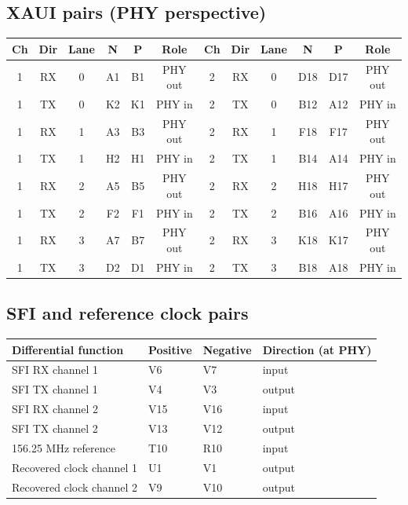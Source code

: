 \documentclass[10pt,a4paper]{article}
\begin{document}
\subsection{XAUI pairs (PHY perspective)}
\small
\begin{tabular}{@{}cccccc|cccccc@{}}\toprule
Ch & Dir & Lane & N & P & Role & Ch & Dir & Lane & N & P & Role\\\midrule
1 & RX & 0 & A1 & B1 & PHY out & 2 & RX & 0 & D18 & D17 & PHY out\\
1 & TX & 0 & K2 & K1 & PHY in & 2 & TX & 0 & B12 & A12 & PHY in\\
1 & RX & 1 & A3 & B3 & PHY out & 2 & RX & 1 & F18 & F17 & PHY out\\
1 & TX & 1 & H2 & H1 & PHY in & 2 & TX & 1 & B14 & A14 & PHY in\\
1 & RX & 2 & A5 & B5 & PHY out & 2 & RX & 2 & H18 & H17 & PHY out\\
1 & TX & 2 & F2 & F1 & PHY in & 2 & TX & 2 & B16 & A16 & PHY in\\
1 & RX & 3 & A7 & B7 & PHY out & 2 & RX & 3 & K18 & K17 & PHY out\\
1 & TX & 3 & D2 & D1 & PHY in & 2 & TX & 3 & B18 & A18 & PHY in\\
\bottomrule\end{tabular}\normalsize
\subsection{SFI and reference clock pairs}
\begin{tabularx}{\linewidth}{@{}p{47mm}p{33mm}p{30mm}X@{}}\toprule
Differential function & Positive & Negative & Direction (at PHY)\\\midrule
SFI RX channel 1 & V6 & V7 & input\\
SFI TX channel 1 & V4 & V3 & output\\
SFI RX channel 2 & V15 & V16 & input\\
SFI TX channel 2 & V13 & V12 & output\\
156.25 MHz reference & T10 & R10 & input\\
Recovered clock channel 1 & U1 & V1 & output\\
Recovered clock channel 2 & V9 & V10 & output\\\bottomrule\end{tabularx}
\end{document}
